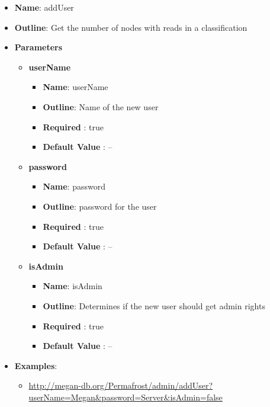 \documentclass[11pt]{article}
\begin{document}
\begin{itemize}
	\item \textbf{Name}: addUser
	\item \textbf{Outline}: Get the number of nodes with reads in a classification
	\item \textbf{Parameters}
		\begin{itemize}
			\item \textbf{userName}		
				\begin{itemize}
					\item \textbf{Name}: userName
					\item \textbf{Outline}: Name of the new user
					\item \textbf{Required} : true
					\item \textbf{Default Value} : --
				\end{itemize}
			\item \textbf{password}		
				\begin{itemize}
					\item \textbf{Name}: password
					\item \textbf{Outline}: password for the user
					\item \textbf{Required} : true
					\item \textbf{Default Value} : --
				\end{itemize}
			\item \textbf{isAdmin}		
				\begin{itemize}
					\item \textbf{Name}: isAdmin
					\item \textbf{Outline}: Determines if the new user should get admin rights
					\item \textbf{Required} : true
					\item \textbf{Default Value} : --
				\end{itemize}
		\end{itemize}
	\item \textbf{Examples}:
		\begin{itemize}		
			\item \url{http://megan-db.org/Permafrost/admin/addUser?userName=Megan&password=Server&isAdmin=false}
		\end{itemize}
\end{itemize}
\end{document}

